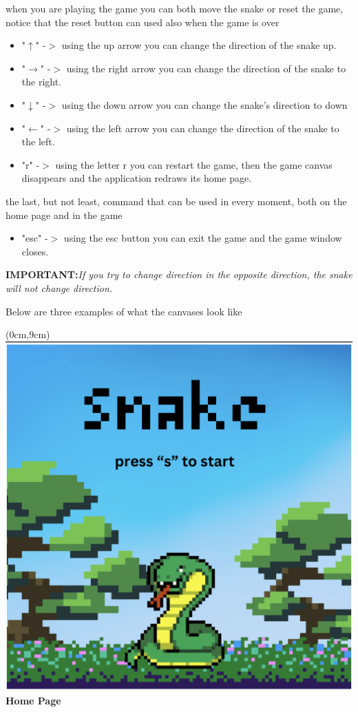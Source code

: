 \documentclass{article}
\begin{document}
	\noindent when you are playing the game you can both move the snake or reset the game, notice that the reset button can used also when the game is over
	
	\begin{itemize}
		\item "$\uparrow$" -$>$ using the up arrow you can change the direction of the snake up.
		\item "$\rightarrow$" -$>$ using the right arrow you can change the direction of the snake to the right.
		\item "$\downarrow$" -$>$ using the down arrow you can change the snake's direction to down
		\item "$\leftarrow$" -$>$ using the left arrow you can change the direction of the snake to the left.
		\item "r" -$>$ using the letter r you can restart the game, then the game canvas disappears and the application redraws its home page.
	\end{itemize}
	
	\noindent the last, but not least, command that can be used in every moment, both on the home page and in the game
	
	\begin{itemize}
		\item "esc" -$>$ using the esc button you can exit the game and the game window closes.
	\end{itemize}
	
	\noindent\large{\textbf{IMPORTANT:}}\emph{If you try to change direction in the opposite direction, the snake will not change direction.}\\
	
	\begin{centering}
		\centering Below are three examples of what the canvases look like
	\end{centering}
	
	\begin{textblock*}{10cm}(0cm,9cm)
		\centering
		\includegraphics[width=.5\linewidth]{home.png}\\
		\Large{\textbf{Home Page}}
	\end{textblock*}
	
\end{document}
